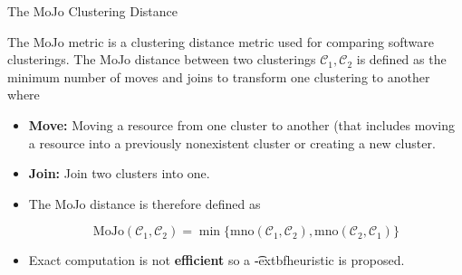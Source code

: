 \documentclass{beamer}
\begin{document}
\begin{frame}{The MoJo Clustering Distance}

The MoJo \cite{mojo} metric is a clustering distance metric used for comparing software clusterings. The MoJo distance between two clusterings $\mathcal C_1, \mathcal C_2$ is defined as the minimum number of moves and joins to transform one clustering to another where 
\begin{itemize}
    \item<1-> \textbf{Move:} Moving a resource from one cluster to another (that includes moving a resource into a previously nonexistent cluster or creating a new cluster.
    \item<2-> \textbf{Join:} Join two clusters into one.
	\item<3-> The MoJo distance is therefore defined as 

$$\textrm{MoJo} (\mathcal C_1, \mathcal C_2) = \min \{ \textrm{mno} (\mathcal C_1, \mathcal C_2), \textrm{mno}(\mathcal C_2, \mathcal C_1) \}$$
    \item<4-> Exact computation is not \textbf{efficient} so a \t-extbf{heuristic} is proposed.


\end{itemize}

\end{frame}
\end{document}
